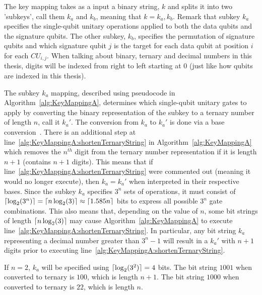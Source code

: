 The key mapping takes as a input a binary string, $k$ and splits it into two 'subkeys', call them $k_a$ and $k_b$, meaning that $k = k_a,k_b$. Remark that subkey $k_a$ specifies the single-qubit unitary operations applied to both the data qubits and the signature qubits. The other subkey, $k_b$, specifies the permutation of signature qubits and which signature qubit $j$ is the target for each data qubit at position $i$ for each $\mathit{CU}_{i,j}$. When talking about binary, ternary and decimal numbers in this thesis, digits will be indexed from right to left starting at $0$ (just like how qubits are indexed in this thesis).

The subkey $k_a$ mapping, described using pseudocode in Algorithm~\ref{alg:KeyMappingA}, determines which single-qubit unitary gates to apply by converting the binary representation of the subkey to a ternary number of length $n$, call it $k_a'$. The conversion from $k_a$ to $k_a'$ is done via a base conversion~\cite{BaseConversionWikipedia}. There is an additional step at line~\ref{alg:KeyMappingA:shortenTernaryString} in Algorithm~\ref{alg:KeyMappingA} which removes the $n^{th}$ digit from the ternary number representation if it is length $n+1$ (contains $n+1$ digits). This means that if line~\ref{alg:KeyMappingA:shortenTernaryString} were commented out (meaning it would no longer execute), then $k_a = k_a'$ when interpreted in their respective bases. Since the subkey $k_a$ specifies $3^n$ sets of operations, it must consist of $\lceil\log_2 (3^n)\rceil = \lceil n \log_2 (3)\rceil \approx \lceil1.585 n\rceil$ bits to express all possible $3^n$ gate combinations. This also means that, depending on the value of $n$, some bit strings of length $\lceil n \log_2 (3)\rceil$ may cause Algorithm~\ref{alg:KeyMappingA} to execute line~\ref{alg:KeyMappingA:shortenTernaryString}. In particular, any bit string $k_a$ representing a decimal number greater than $3^n - 1$ will result in a $k_a'$ with $n+1$ digits prior to executing line~\ref{alg:KeyMappingA:shortenTernaryString}.

\begin{example}
If $n = 2$, $k_a$ will be specified using $\lceil\log_2 (3^2)\rceil = 4$ bits. The bit string $1001$ when converted to ternary is $100$, which is length $n+1$. The bit string $1000$ when converted to ternary is $22$, which is length $n$.
\end{example}

